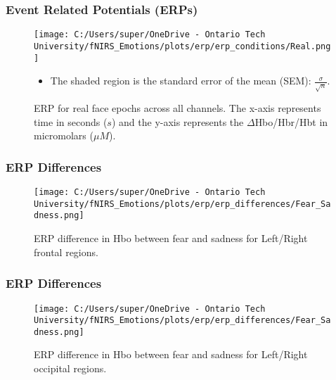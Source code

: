 \documentclass{beamer}
\begin{document}
\begin{frame}
    \frametitle{Event Related Potentials (ERPs)}
    \begin{figure}
        \texttt{[image: C:/Users/super/OneDrive - Ontario Tech University/fNIRS\_Emotions/plots/erp/erp\_conditions/Real.png]}
        \caption{ERP for real face epochs across all channels. The x-axis represents time in seconds ($s$) and the y-axis represents the $\Delta$Hbo/Hbr/Hbt in micromolars ($\mu M$).}
        \begin{itemize}
            \item The shaded region is the standard error of the mean (SEM): $\frac{\sigma}{\sqrt{n}}$. 
        \end{itemize}
    \end{figure}
\end{frame}

\begin{frame}
    \frametitle{ERP Differences}
    \begin{figure}
        \texttt{[image: C:/Users/super/OneDrive - Ontario Tech University/fNIRS\_Emotions/plots/erp/erp\_differences/Fear\_Sadness.png]}
        \caption{ERP difference in Hbo between fear and sadness for Left/Right frontal regions. }
    \end{figure}
\end{frame}

\begin{frame}
    \frametitle{ERP Differences}
    \begin{figure}
        \texttt{[image: C:/Users/super/OneDrive - Ontario Tech University/fNIRS\_Emotions/plots/erp/erp\_differences/Fear\_Sadness.png]}
        \caption{ERP difference in Hbo between fear and sadness for Left/Right occipital regions. }
    \end{figure}
\end{frame}
\end{document}
